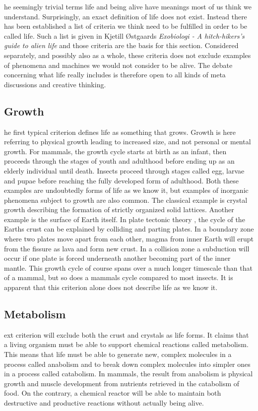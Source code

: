 \noindent
{}he seemingly trivial terms life and being alive have meanings most of us think we understand.
Surprisingly, an exact definition of life does not exist.
Instead there has been established a list of criteria we think need to be fulfilled in order to be called life.
Such a list is given in Kjetill Østgaards \textit{Exobiologi - A hitch-hikers's guide to alien life} \cite{Exoboken} and those criteria are the basis for this section.
Considered separately, and possibly also as a whole, these criteria does not exclude examples of phenomena and machines we would not consider to be alive.
The debate concerning what life really includes is therefore open to all kinds of meta discussions and creative thinking.

\subsection*{Growth}
he first typical criterion defines life as something that grows.
Growth is here referring to physical growth leading to increased size, and not personal or mental growth.
For mammals, the growth cycle starts at birth as an infant, then proceeds through the stages of youth and adulthood before ending up as an elderly individual until death.
Insects proceed through stages called egg, larvae and pupae before reaching the fully developed form of adulthood.
Both these examples are undoubtedly forms of life as we know it, but examples of inorganic phenomena subject to growth are also common.
The classical example is crystal growth describing the formation of strictly organized solid lattices.
Another example is the surface of Earth itself.
In plate tectonic theory \cite{tectonic}, the cycle of the Earths crust can be explained by colliding and parting plates.
In a boundary zone where two plates move apart from each other, magma from inner Earth will erupt from the fissure as lava and form new crust.
In a collision zone a subduction will occur if one plate is forced underneath another becoming part of the inner mantle.
This growth cycle of course spans over a much longer timescale than that of a mammal, but so does a mammals cycle compared to most insects.
It is apparent that this criterion alone does not describe life as we know it.

\subsection*{Metabolism}
ext criterion will exclude both the crust and crystals as life forms.
It claims that a living organism must be able to support chemical reactions called metabolism.
This means that life must be able to generate new, complex molecules in a process called anabolism and to break down complex molecules into simpler ones in a process called catabolism.
In mammals, the result from anabolism is physical growth and muscle development from nutrients retrieved in the catabolism of food.
On the contrary, a chemical reactor will be able to maintain both destructive and productive reactions without actually being alive.

